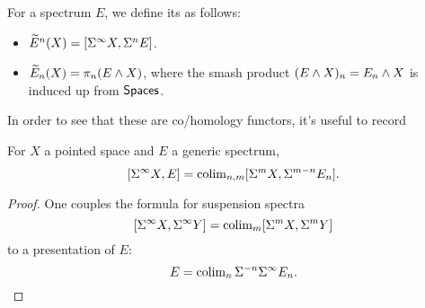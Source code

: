 \begin{definition}
For a spectrum $E$, we define its  as follows:
\begin{itemize}
    \item $\widetilde E^n(X) = [\Sigma^\infty X, \Sigma^n E]$.
    \item $\widetilde E_n(X) = \pi_n(E \wedge X)$, where the smash product $(E \wedge X)_n =  E_n \wedge X$ is induced up from $\mathsf{Spaces}$.
\end{itemize}
\end{definition}

In order to see that these are co/homology functors, it's useful to record
\begin{lemma}
%
For $X$ a pointed space and $E$ a generic spectrum,%
\[[\Sigma^\infty X, E] = \operatorname{colim}_{n,m} [\Sigma^m X, \Sigma^{m-n} E_n].\]
\end{lemma}
\begin{proof}
One couples the formula for suspension spectra \[[\Sigma^\infty X, \Sigma^\infty Y] = \operatorname{colim}_m [\Sigma^m X, \Sigma^m Y]\] to a presentation of $E$: \[E = \operatorname{colim}_n \Sigma^{-n} \Sigma^\infty E_n. \qedhere\]
\end{proof}

